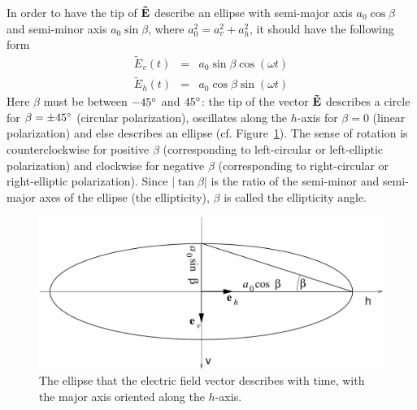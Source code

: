 In order to have the tip of $\mathbf{\tilde{E}}$ describe an ellipse with semi-major axis $a_0 \cos\beta$
and
semi-minor axis $a_0 \sin\beta$, where $a_0^2 = a_v^2 + a_h^2$, 
it should have the following form
\begin{eqnarray}
  \label{eq:polarization:ellipse_parallel}
 \tilde{E}_v (t) &=&   a_0 \sin\beta \cos(\omega t)\\
 \tilde{E}_h (t) &=&   a_0 \cos\beta \sin(\omega t)
\end{eqnarray}
Here $\beta$ must be between $-45^\circ$ and $45^\circ$: the tip of
the vector $\mathbf{\tilde{E}}$ describes a circle for $\beta = \pm
45^\circ$ (circular polarization), oscillates along the $h$-axis for
$\beta = 0$ (linear polarization) and else describes an ellipse (cf.
Figure~\ref{fig:polarization:ellipse_aligned}). The sense of rotation
is counterclockwise for positive $\beta$ (corresponding to left-circular
or left-elliptic polarization) and clockwise for negative
$\beta$ (corresponding to right-circular
or right-elliptic polarization).
Since $|\tan\beta|$ is the ratio of the semi-minor and semi-major axes
of the ellipse (the ellipticity), $\beta$ is called the ellipticity
angle.\label{def:ellipticity-angle}
\begin{figure}[!ht]
 \begin{center}
  \begin{minipage}[c]{0.9\textwidth}
   \begin{center}
    \includegraphics*[width=0.9\hsize]{Figs/polarization/pol_ellipse_aligned}
   \end{center}
  \end{minipage}
  \begin{minipage}[c]{0.9\textwidth}
   \caption{The ellipse that the electric field vector describes with
     time, with the major axis oriented along the $h$-axis.}
   \label{fig:polarization:ellipse_aligned}
  \end{minipage}
 \end{center}
\end{figure}   
